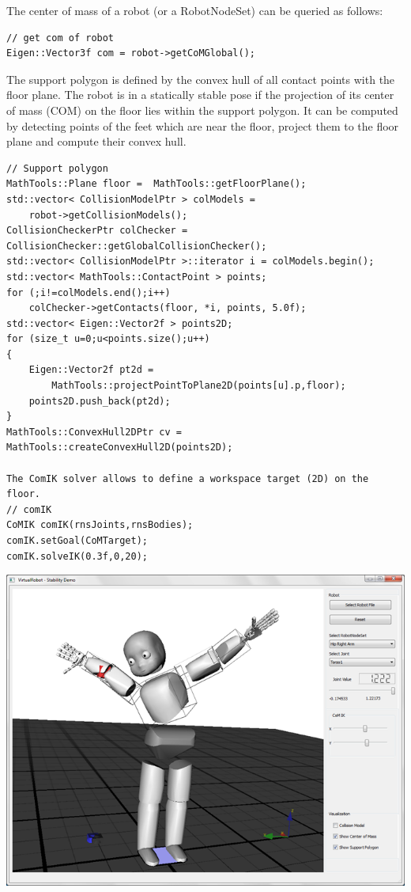 The center of mass of a robot (or a RobotNodeSet) can be queried as follows: 
\begin{lstlisting}
// get com of robot
Eigen::Vector3f com = robot->getCoMGlobal();
\end{lstlisting}
The support polygon is defined by the convex hull of all contact points with the floor plane. The robot is in a statically stable pose if the projection of its center of mass (COM) on the floor lies within the support polygon. It can be computed by detecting points of the feet which are near the floor, project them to the floor plane and compute their convex hull.
\begin{lstlisting}
// Support polygon
MathTools::Plane floor =  MathTools::getFloorPlane();
std::vector< CollisionModelPtr > colModels =  
    robot->getCollisionModels();
CollisionCheckerPtr colChecker = CollisionChecker::getGlobalCollisionChecker();
std::vector< CollisionModelPtr >::iterator i = colModels.begin();
std::vector< MathTools::ContactPoint > points;
for (;i!=colModels.end();i++)
    colChecker->getContacts(floor, *i, points, 5.0f);
std::vector< Eigen::Vector2f > points2D;
for (size_t u=0;u<points.size();u++)
{
    Eigen::Vector2f pt2d = 
        MathTools::projectPointToPlane2D(points[u].p,floor);
    points2D.push_back(pt2d);
}
MathTools::ConvexHull2DPtr cv = MathTools::createConvexHull2D(points2D);

The ComIK solver allows to define a workspace target (2D) on the floor.
// comIK
CoMIK comIK(rnsJoints,rnsBodies);
comIK.setGoal(CoMTarget);
comIK.solveIK(0.3f,0,20);
\end{lstlisting}
\includegraphics[width=\textwidth]{StabilityDemo}
